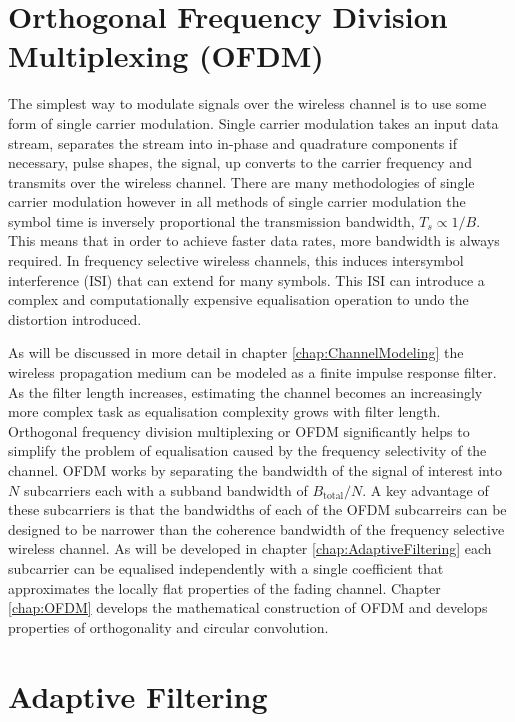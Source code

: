 \section{Orthogonal Frequency Division Multiplexing %
(OFDM)}
\label{sec:OFDMIntro}
The simplest way to modulate signals over the wireless %
channel is to use some form of single carrier modulation. %
Single carrier modulation takes an input data stream, %
separates the stream into in-phase and quadrature components %
if necessary, pulse shapes, the signal, up converts to the %
carrier frequency and transmits over the wireless channel. %
There are many methodologies of single carrier modulation %
however in all methods of single carrier modulation %
the symbol time is inversely proportional the transmission %
bandwidth, $T_{s} \propto 1/B$. This means that in order to %
achieve faster data rates, more bandwidth is always required. %
In frequency selective wireless channels, this induces intersymbol %
interference (ISI) that can extend for many symbols. This ISI %
can introduce a complex and computationally expensive equalisation %
operation to undo the distortion introduced.

As will be discussed in more detail in chapter %
\ref{chap:ChannelModeling} the wireless propagation medium can be %
modeled as a finite impulse response filter\cite{Jer00}. 
As the filter length increases, estimating %
the channel becomes an increasingly more complex task as %
equalisation complexity grows with filter length. %
Orthogonal frequency division multiplexing or OFDM significantly %
helps to simplify the problem of equalisation caused by %
the frequency selectivity of the channel. OFDM works by %
separating the bandwidth of the signal of interest into %
$N$ subcarriers each with a subband bandwidth of %
$B_{\text{total}}/N$. A key advantage of these subcarriers %
is that the bandwidths of each of the OFDM subcarreirs can %
be designed to be narrower than the coherence bandwidth %
of the frequency selective wireless channel. As will be %
developed in chapter \ref{chap:AdaptiveFiltering} each %
subcarrier can be equalised independently with a single %
coefficient that approximates the locally flat properties %
of the fading channel. Chapter \ref{chap:OFDM} develops %
the mathematical construction of OFDM and develops %
properties of orthogonality and circular convolution.
\newpage
\section{Adaptive Filtering}

